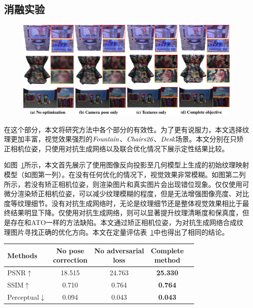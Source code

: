 \subsection{消融实验}
\begin{figure}[ht]
\centering
\includegraphics[width=1\linewidth]{pic/work1/final.pdf}
\label{fig:ex1_2}
\end{figure}
在这个部分，本文将研究方法中各个部分的有效性。为了更有说服力，本文选择纹理更加丰富，视觉效果强烈的$\emph{Fountain}$、$\emph{Chairs26}$、$\emph{Desk}$场景。本文分别在只矫正相机位姿，只使用对抗生成网络以及联合优化情况下展示定性结果比较。\par
如图~\ref{fig:ex1_2}所示，本文首先展示了使用图像反向投影至几何模型上生成的初始纹理映射模型（如图第一列）。在没有任何优化的情况下，视觉效果非常模糊。如图第二列所示，若没有矫正相机位姿，则渲染图片和真实图片会出现错位现象。仅仅使用可微分渲染矫正相机位姿，可以减少纹理模糊的程度，但是无法增强图像亮度、对比度等纹理细节。没有对抗生成网络时，无论是纹理细节还是整体视觉效果相比于最终结果明显下降。仅使用对抗生成网络，则可以显著提升纹理清晰度和保真度，但是存在和ATO一样的方法缺陷。本文通过矫正相机位姿，为对抗生成网络合成纹理图片寻找正确的优化方向。本文在定量评估表~\ref{tab:ablation1}中也得出了相同的结论。\par
\begin{table}[h]
\renewcommand{\arraystretch}{1.3}
\label{tab:ablation1}
	\centering
		\begin{tabular}{lcccc}
			\hline
			{Methods} & \tabincell{c}{No pose \\ correction} &\tabincell{c}{No adversarial \\ loss} & \tabincell{c}{Complete \\ method} \\
			\hline
			PSNR$\uparrow$ & 18.515 & 24.763 & \textbf{25.330}\\
			SSIM$\uparrow$ & 0.710  & 0.764 & \textbf{0.764}\\
			Perceptual$\downarrow$ & 0.094  & 0.043 & \textbf{0.043}\\
			\hline
		\end{tabular}
\end{table}


